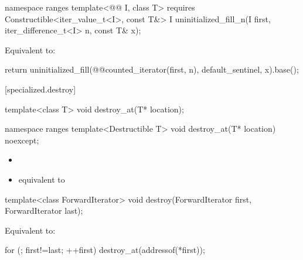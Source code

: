 \begin{addedblock}
%
\begin{itemdecl}
namespace ranges {
  template<@@ I, class T>
      requires Constructible<iter_value_t<I>, const T&>
    I uninitialized_fill_n(I first, iter_difference_t<I> n, const T& x);
}
\end{itemdecl}

\begin{itemdescr}
\pnum
\effects Equivalent to:
\begin{codeblock}
return uninitialized_fill(@@counted_iterator(first, n), default_sentinel{}, x).base();
\end{codeblock}
\end{itemdescr}
\end{addedblock}

[specialized.destroy]{}

%
\begin{itemdecl}
template<class T>
  void destroy_at(T* location);
\end{itemdecl}
\begin{addedblock}
\begin{itemdecl}
namespace ranges {
  template<Destructible T>
    void destroy_at(T* location) noexcept;
}
\end{itemdecl}
\end{addedblock}

\begin{itemdescr}
\pnum
\effects
\begin{itemize}
\item {}
\item {} equivalent to
\end{itemize}
\end{itemdescr}

%
\begin{itemdecl}
template<class ForwardIterator>
  void destroy(ForwardIterator first, ForwardIterator last);
\end{itemdecl}

\begin{itemdescr}
\pnum
\effects
Equivalent to:
\begin{codeblock}
for (; first!=last; ++first)
  destroy_at(addressof(*first));
\end{codeblock}
\end{itemdescr}

